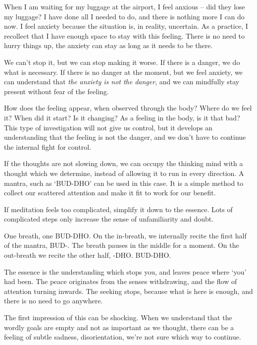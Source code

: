 When I am waiting for my luggage at the airport, I feel anxious -- did
they lose my luggage? I have done all I needed to do, and there is
nothing more I can do now. I feel anxiety because the situation is, in
reality, uncertain. As a practice, I recollect that I have enough space
to stay with this feeling. There is no need to hurry things up, the
anxiety can stay as long as it needs to be there.

We can't stop it, but we can stop making it worse. If there is a danger,
we do what is necessary. If there is no danger at the moment, but we
feel anxiety, we can understand that \emph{the anxiety is not the
danger}, and we can mindfully stay present without fear of the feeling.


How does the feeling appear, when observed through the body? Where do we
feel it? When did it start? Is it changing? As a feeling in the body, is
it that bad? This type of investigation will not give us control, but it
develops an understanding that the feeling is not the danger, and we
don't have to continue the internal fight for control.

If the thoughts are not slowing down, we can occupy the thinking mind
with a thought which we determine, instead of allowing it to run in
every direction. A mantra, such as `BUD-DHO' can be used in this case.
It is a simple method to collect our scattered attention and make it fit
to work for our benefit.

If meditation feels too complicated, simplify it down to the essence.
Lots of complicated steps only increase the sense of unfamiliarity and
doubt.

\enlargethispage*{\baselineskip}

One breath, one BUD-DHO. On the in-breath, we internally recite the
first half of the mantra, BUD-. The breath pauses in the middle for a
moment. On the out-breath we recite the other half, -DHO. BUD-DHO.

The essence is the understanding which stops you, and leaves peace where
`you' had been. The peace originates from the senses withdrawing, and
the flow of attention turning inwards. The seeking stops, because what
is here is enough, and there is no need to go anywhere.


The first impression of this can be shocking. When we understand that
the wordly goals are empty and not as important as we thought, there can
be a feeling of subtle sadness, disorientation, we're not sure which way
to continue.

